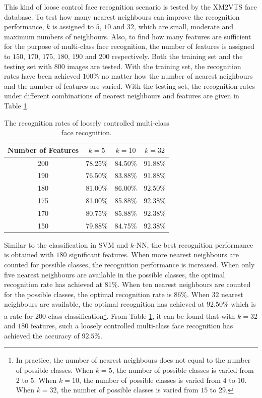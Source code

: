 This kind of loose control face recognition scenario is tested by the \mbox{XM2VTS} face database. To test how many nearest neighbours can improve the recognition performance, $k$ is assigned to $5$, $10$ and $32$, which are small, moderate and maximum numbers of neighbours. Also, to find how many features are sufficient for the purpose of multi-class face recognition, the number of features is assigned to $150$, $170$, $175$, $180$, $190$ and $200$ respectively. Both the training set and the testing set with $800$ images are tested. With the training set, the recognition rates have been achieved $100\%$ no matter how the number of nearest neighbours and the number of features are varied. With the testing set, the recognition rates under different combinations of nearest neighbours and features are given in \mbox{Table} \ref{tab:looseface}.
\begin{table}[ht]
\begin{center}
\caption{The recognition rates of loosely controlled multi-class face recognition.}
\begin{tabular}{|c|c|c|c|}
\hline
 Number of Features & $k=5$ & $k=10$ & $k=32$ \\
\hline
 200 & 78.25\% & 84.50\% & 91.88\% \\
 190 & 76.50\% & 83.88\% & 91.88\% \\
 180 & 81.00\% & 86.00\% & 92.50\% \\
 175 & 81.00\% & 85.88\% & 92.38\% \\
 170 & 80.75\% & 85.88\% & 92.38\% \\
 150 & 79.88\% & 84.75\% & 92.38\% \\
\hline
\end{tabular}  
\label{tab:looseface}
\end{center}
\end{table} 
Similar to the classification in SVM and $k$-NN, the best recognition performance is obtained with $180$ significant features. When more nearest neighbours are counted for possible classes, the recognition performance is increased. When only five nearest neighbours are available in the possible classes, the optimal recognition rate has achieved at $81\%$. When ten nearest neighbours are counted for the possible classes, the optimal recognition rate is $86\%$. When $32$ nearest neighbours are available, the optimal recognition has achieved at $92.50\%$ which is a rate for 200-class classification\footnote{In practice, the number of nearest neighbours does not equal to the number of possible classes. When $k=5$, the number of possible classes is varied from $2$ to $5$. When $k=10$, the number of possible classes is varied from $4$ to $10$. When $k=32$, the number of possible classes is varied from $15$ to $29$.}. From \mbox{Table} \ref{tab:looseface}, it can be found that with $k=32$ and $180$ features, such a loosely controlled multi-class face recognition has achieved the accuracy of $92.5\%$.

